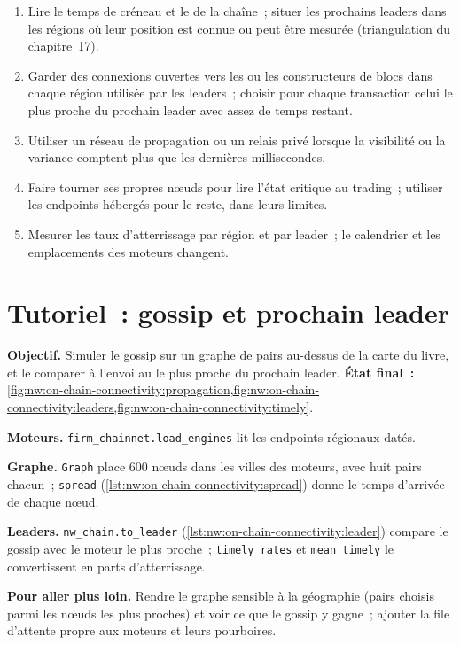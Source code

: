 \begin{method}\label{met:nw:on-chain-connectivity:send}
\begin{enumerate}
\item Lire le temps de créneau et le  de la chaîne~; situer les prochains leaders dans les régions où leur position est connue ou peut être mesurée
  (triangulation du chapitre~17).
\item Garder des connexions ouvertes vers les  ou les constructeurs de blocs dans chaque région utilisée par les leaders~; choisir pour chaque transaction celui le plus proche du prochain
  leader avec assez de temps restant.
\item Utiliser un réseau de propagation ou un relais privé lorsque la visibilité ou la variance comptent plus que les dernières millisecondes.
\item Faire tourner ses propres nœuds pour lire l'état critique au trading~; utiliser les endpoints hébergés pour le reste, dans leurs limites.
\item Mesurer les taux d'atterrissage par région et par leader~; le calendrier et les emplacements des moteurs changent.
\end{enumerate}
\end{method}

\section{Tutoriel~: gossip et prochain leader}\label{tut:nw:on-chain-connectivity:tut}

\begin{tutorial}
\textbf{Objectif.} Simuler le gossip sur un graphe de pairs au-dessus de la carte du livre, et le comparer à l'envoi au  le plus proche du prochain leader.
\textbf{État final~:} \cref{fig:nw:on-chain-connectivity:propagation,fig:nw:on-chain-connectivity:leaders,fig:nw:on-chain-connectivity:timely}.
\begin{tutsteps}
\item \textbf{Moteurs.} \texttt{firm\_chainnet.load\_engines} lit les endpoints régionaux datés.
\item \textbf{Graphe.} \texttt{Graph} place 600 nœuds dans les villes des moteurs, avec huit pairs chacun~; \texttt{spread} (\cref{lst:nw:on-chain-connectivity:spread})
  donne le temps d'arrivée de chaque nœud.
\item \textbf{Leaders.} \texttt{nw\_chain.to\_leader} (\cref{lst:nw:on-chain-connectivity:leader}) compare le gossip avec le moteur le plus proche~;
  \texttt{timely\_rates} et \texttt{mean\_timely} le convertissent en parts d'atterrissage.
\end{tutsteps}
\textbf{Pour aller plus loin.} Rendre le graphe sensible à la géographie (pairs choisis parmi les nœuds les plus proches) et voir ce que le gossip y gagne~; ajouter la file d'attente propre aux moteurs
et leurs pourboires.
\end{tutorial}

